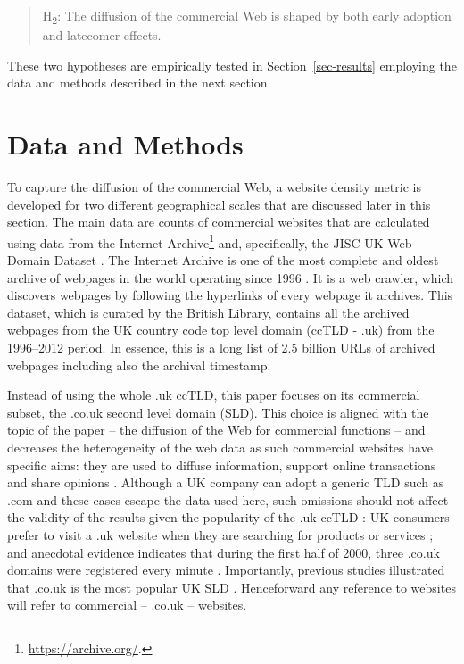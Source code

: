 \documentclass[
  authoryear,
  preprint,
  3p]{elsarticle}
\begin{document}
\begin{quote}
H\textsubscript{2}: The diffusion of the commercial Web is shaped by
both early adoption and latecomer effects.
\end{quote}

These two hypotheses are empirically tested in Section~\ref{sec-results}
employing the data and methods described in the next section.

\section{Data and Methods}\label{sec-datamethods}

To capture the diffusion of the commercial Web, a website density metric
is developed for two different geographical scales that are discussed
later in this section. The main data are counts of commercial websites
that are calculated using data from the Internet Archive\footnote{\url{https://archive.org/}.}
and, specifically, the JISC UK Web Domain Dataset \citep{ukwebarchive}.
The Internet Archive is one of the most complete and oldest archive of
webpages in the world operating since 1996
\citep{ainsworth2011much, holzmann2016dawn}. It is a web crawler, which
discovers webpages by following the hyperlinks of every webpage it
archives. This dataset, which is curated by the British Library,
contains all the archived webpages from the UK country code top level
domain (ccTLD - .uk) from the 1996--2012 period. In essence, this is a
long list of 2.5 billion URLs of archived webpages including also the
archival timestamp.

Instead of using the whole .uk ccTLD, this paper focuses on its
commercial subset, the .co.uk second level domain (SLD). This choice is
aligned with the topic of the paper -- the diffusion of the Web for
commercial functions -- and decreases the heterogeneity of the web data
as such commercial websites have specific aims: they are used to diffuse
information, support online transactions and share opinions
\citep{THELWALL2000441, blazquez2018big}. Although a UK company can
adopt a generic TLD such as .com and these cases escape the data used
here, such omissions should not affect the validity of the results given
the popularity of the .uk ccTLD \citep{tranosuk}: UK consumers prefer to
visit a .uk website when they are searching for products or services
\citep{hope}; and anecdotal evidence indicates that during the first
half of 2000, three .co.uk domains were registered every minute
\citep{oecd_coms}. Importantly, previous studies illustrated that .co.uk
is the most popular UK SLD \citep{tranosuk}. Henceforward any reference
to websites will refer to commercial -- .co.uk -- websites.
\end{document}

